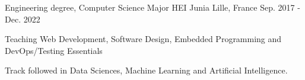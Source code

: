 

\begin{cventries}

  \cventry
    {Engineering degree, Computer Science Major} %
    {HEI Junia} %
    {Lille, France} %
    {Sep. 2017 - Dec. 2022} %
    {
      \begin{cvitems} %
        \item {Teaching Web Development, Software Design, Embedded Programming and DevOps/Testing Essentials }
        \item {Track followed in Data Sciences, Machine Learning and Artificial Intelligence.}
      \end{cvitems}
    }

\end{cventries}
